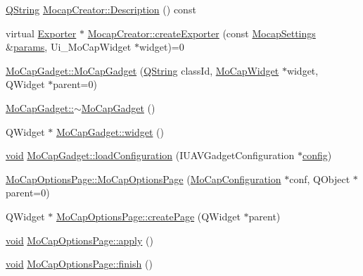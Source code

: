 \begin{DoxyCompactItemize}
\hyperlink{group___u_a_v_objects_plugin_gab9d252f49c333c94a72f97ce3105a32d}{Q\-String} \hyperlink{group___mo_cap_plugin_ga0eb79ab6540fef8926129b47aef0a2a8}{Mocap\-Creator\-::\-Description} () const 
\item 
virtual \hyperlink{class_exporter}{Exporter} $\ast$ \hyperlink{group___mo_cap_plugin_gaa300503bdf633291aeab43797cc61939}{Mocap\-Creator\-::create\-Exporter} (const \hyperlink{group___mo_cap_plugin_ga6083347a5b3eb70e360f599354dc0f0b}{Mocap\-Settings} \&\hyperlink{glext_8h_afeb6390ab3bc8a0e96a88aff34d52288}{params}, Ui\-\_\-\-Mo\-Cap\-Widget $\ast$widget)=0
\item 
\hyperlink{group___mo_cap_plugin_ga539f5d9892beeecc36e51d97dacd3263}{Mo\-Cap\-Gadget\-::\-Mo\-Cap\-Gadget} (\hyperlink{group___u_a_v_objects_plugin_gab9d252f49c333c94a72f97ce3105a32d}{Q\-String} class\-Id, \hyperlink{class_mo_cap_widget}{Mo\-Cap\-Widget} $\ast$widget, Q\-Widget $\ast$parent=0)
\item 
\hyperlink{group___mo_cap_plugin_gabcb6599fae9fd93655a6f2c9d72f13e0}{Mo\-Cap\-Gadget\-::$\sim$\-Mo\-Cap\-Gadget} ()
\item 
Q\-Widget $\ast$ \hyperlink{group___mo_cap_plugin_ga10e2501808e097eccf87a35bc8111c20}{Mo\-Cap\-Gadget\-::widget} ()
\item 
\hyperlink{group___u_a_v_objects_plugin_ga444cf2ff3f0ecbe028adce838d373f5c}{void} \hyperlink{group___mo_cap_plugin_ga3ec1dcb97187294b0436fd7a0e5532d1}{Mo\-Cap\-Gadget\-::load\-Configuration} (I\-U\-A\-V\-Gadget\-Configuration $\ast$\hyperlink{deflate_8c_a4473b5227787415097004fd39f55185e}{config})
\item 
\hyperlink{group___mo_cap_plugin_gaab2f4270ddf74e0e284cf1ea61d646c8}{Mo\-Cap\-Options\-Page\-::\-Mo\-Cap\-Options\-Page} (\hyperlink{class_mo_cap_configuration}{Mo\-Cap\-Configuration} $\ast$conf, Q\-Object $\ast$parent=0)
\item 
Q\-Widget $\ast$ \hyperlink{group___mo_cap_plugin_gab507e9ec6cd64d26e3034dcf753885ad}{Mo\-Cap\-Options\-Page\-::create\-Page} (Q\-Widget $\ast$parent)
\item 
\hyperlink{group___u_a_v_objects_plugin_ga444cf2ff3f0ecbe028adce838d373f5c}{void} \hyperlink{group___mo_cap_plugin_gaa5c95a0fa9de269561e8adb51407862a}{Mo\-Cap\-Options\-Page\-::apply} ()
\item 
\hyperlink{group___u_a_v_objects_plugin_ga444cf2ff3f0ecbe028adce838d373f5c}{void} \hyperlink{group___mo_cap_plugin_ga00ac715fe603d78584cf772904147f38}{Mo\-Cap\-Options\-Page\-::finish} ()
\item 

\end{DoxyCompactItemize}
